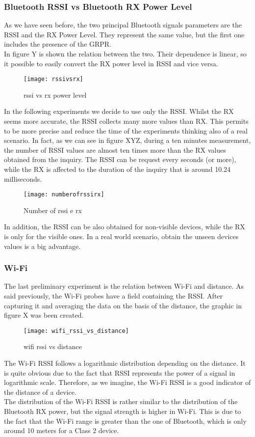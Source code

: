 \subsubsection{Bluetooth RSSI vs Bluetooth RX Power Level}
As we have seen before, the two principal Bluetooth signals parameters are the RSSI and the RX Power Level. 
They represent the same value, but the first one includes the presence of the GRPR. \\
In figure Y is shown the relation between the two. Their dependence is linear, so it possible to easily convert the RX power level in RSSI  and vice versa.
\begin{figure}[H]
\centering
\texttt{[image: rssivsrx]}
\caption{rssi vs rx power level}
\end{figure}
In the following experiments we decide to use only the RSSI. Whilst the RX seems more accurate, the RSSI collects many more values than RX. This permits to be more precise and reduce the time of the experiments thinking also of a real scenario. In fact, as we can see in figure XYZ,  during a ten minutes measurement, the number of RSSI values are almost ten times more than the RX values obtained from the inquiry. The RSSI can be request every seconds (or more), while the RX is affected to the duration of the inquiry that is around 10.24 milliseconds.
\begin{figure}[H]
\centering
\texttt{[image: numberofrssirx]}
\caption{Number of rssi e rx}
\end{figure}

In addition, the RSSI can be also obtained for non-visible devices, while the RX is only for the visible ones. In a real world scenario, obtain the unseen devices values is a big advantage.



\subsubsection{Wi-Fi}
The last preliminary experiment is the relation between Wi-Fi and distance. As said previously, the Wi-Fi probes have a field containing the RSSI. After capturing it and averaging the data on the basis of the distance, the graphic in figure X was been created.
\begin{figure}[H]
\centering
\texttt{[image: wifi\_rssi\_vs\_distance]}
\caption{wifi rssi vs distance}
\end{figure}
The Wi-Fi RSSI follows a logarithmic distribution depending on the distance. It is quite obvious due to the fact that RSSI represents the power of a signal in logarithmic scale. Therefore, as we imagine, the Wi-Fi RSSI is a good indicator of the distance of a device.\\
The distribution of the Wi-Fi RSSI is rather similar to the distribution of the Bluetooth RX power, but the signal strength is higher in Wi-Fi. This is due to the fact that the Wi-Fi range is greater than the one of Bluetooth, which is only around 10 meters for a Class 2 device.


